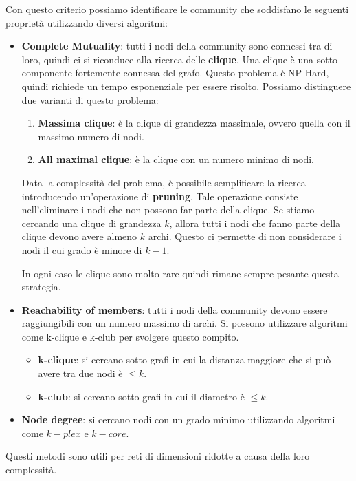 Con questo criterio possiamo identificare le community che soddisfano le seguenti
proprietà utilizzando diversi algoritmi:
\begin{itemize}
    \item \textbf{Complete Mutuality}: tutti i nodi della community sono connessi
          tra di loro, quindi ci si riconduce alla ricerca delle \textbf{clique}.
          Una clique è una sotto-componente fortemente connessa del grafo.
          Questo problema è NP-Hard, quindi richiede
          un tempo esponenziale per essere risolto. Possiamo distinguere due varianti
          di questo problema:
          \begin{enumerate}
              \item \textbf{Massima clique}: è la clique di grandezza massimale,
                    ovvero quella con il massimo numero di nodi.
              \item \textbf{All maximal clique}: è la clique con un numero minimo
                    di nodi.
          \end{enumerate}
          Data la complessità del problema, è possibile semplificare la ricerca
          introducendo un'operazione di \textbf{pruning}. Tale operazione
          consiste nell'eliminare i nodi che non possono far parte della clique.
          Se stiamo cercando una clique di grandezza $k$, allora tutti i nodi che
          fanno parte della clique devono avere almeno $k$ archi. Questo ci permette
          di non considerare i nodi il cui grado è minore di $k - 1$.

          In ogni caso le clique sono molto rare quindi rimane sempre pesante
          questa strategia.
    \item \textbf{Reachability of members}: tutti i nodi della community devono
          essere raggiungibili con un numero massimo di archi. Si possono utilizzare
          algoritmi come k-clique e k-club per svolgere questo compito.
          \begin{itemize}
              \item \textbf{k-clique}: si cercano sotto-grafi in cui la distanza
                    maggiore che si può avere tra due nodi è $\leq k$.
              \item \textbf{k-club}: si cercano sotto-grafi in cui il diametro è
                    $\leq k$.
          \end{itemize}
    \item \textbf{Node degree}: si cercano nodi con un grado minimo utilizzando
          algoritmi come $k-plex$ e $k-core$.
\end{itemize}
Questi metodi sono utili per reti di dimensioni ridotte a causa della loro
complessità.
